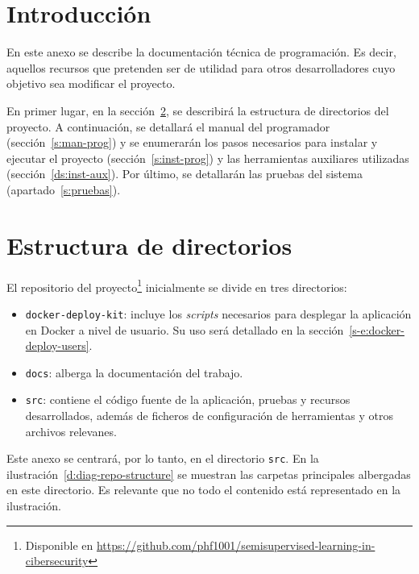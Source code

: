 
\section{Introducción}

En este anexo se describe la documentación técnica de programación. Es decir, aquellos recursos que pretenden ser de utilidad para otros desarrolladores cuyo objetivo sea modificar el proyecto.

En primer lugar, en la sección~\ref{s:estructura-dirs}, se describirá la estructura de directorios del proyecto. A continuación, se detallará el manual del programador (sección~\ref{s:man-prog}) y se enumerarán los pasos necesarios para instalar y ejecutar el proyecto (sección~\ref{s:inst-prog}) y las herramientas auxiliares utilizadas (sección~\ref{ds:inst-aux}). Por último, se detallarán las pruebas del sistema (apartado~\ref{s:pruebas}).

\section{Estructura de directorios}
\label{s:estructura-dirs}

El repositorio del proyecto\footnote{Disponible en \url{https://github.com/phf1001/semisupervised-learning-in-cibersecurity}} inicialmente se divide en tres directorios:

\begin{itemize}
	\item \texttt{docker-deploy-kit}: incluye los \textit{scripts} necesarios para desplegar la aplicación en Docker a nivel de usuario. Su uso será detallado en la sección~\ref{s-e:docker-deploy-users}.
	\item \texttt{docs}: alberga la documentación del trabajo.
	\item \texttt{src}: contiene el código fuente de la aplicación, pruebas y recursos desarrollados, además de ficheros de configuración de herramientas y otros archivos relevanes.
\end{itemize}

Este anexo se centrará, por lo tanto, en el directorio \texttt{src}. En la ilustración~\ref{d:diag-repo-structure} se muestran las carpetas principales albergadas en este directorio. Es relevante que no todo el contenido está representado en la ilustración.

